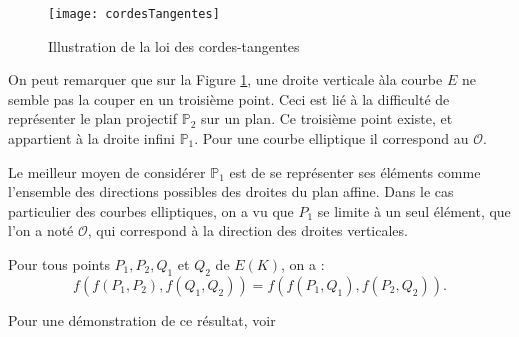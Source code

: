 \begin{figure}[h]
    \centering
    \texttt{[image: cordesTangentes]}
    \caption{Illustration de la loi des cordes-tangentes}
    \label{fig:cordesTangentes}
\end{figure}

On peut remarquer que sur la Figure \ref{fig:cordesTangentes}, une droite verticale
àla courbe $E$ ne semble
pas la couper en un troisième point. Ceci est lié à la difficulté de représenter le plan
projectif $\mathbb{P}_{2}$ sur un plan. Ce troisième point existe, et appartient à la droite infini
$\mathbb{P}_{1}$. Pour une courbe elliptique il correspond au $\mathcal{O}$.

\begin{remarque}
    Le meilleur moyen de considérer $\mathbb{P}_{1}$ est de se représenter ses éléments comme
    l'ensemble des directions possibles des droites du plan affine. Dans le cas particulier
    des courbes elliptiques, on a vu que $P_{1}$ se limite à un seul élément, que l'on a noté
    $\mathcal{O}$, qui correspond à la direction des droites verticales.
\end{remarque}

\begin{proposition}
    Pour tous points $P_1,P_2,Q_1$ et $Q_2$ de $E(K)$, on a :
    \[
    f(f(P_1,P_2),f(Q_1,Q_2)) = f(f(P_1,Q_1),f(P_2,Q_2))
    .\] 

    Pour une démonstration de ce résultat, voir 
\end{proposition}


